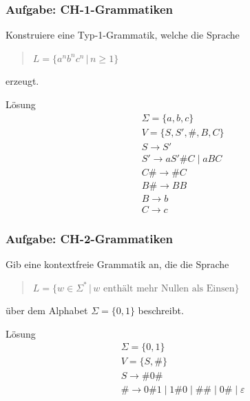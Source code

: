 \begin{frame}
\frametitle{Aufgabe: CH-1-Grammatiken}
Konstruiere eine Typ-1-Grammatik, welche die Sprache

\begin{quote}
  $L = \{a^n b^n c^n \, | \, n \geq 1\}$
\end{quote}

erzeugt.

\invincible
\pause
\begin{block}{Lösung}
\ducttape{-1cm}
\begin{align*}
&\Sigma = \{a, b, c\} \\
&V = \{ S, S', \#, B, C \} \\
&S \rightarrow S' \\
&S' \rightarrow aS'\#C \mid aBC \\
&C\# \rightarrow \#C \\
&B\# \rightarrow BB \\
&B \rightarrow b \\
&C \rightarrow c
\end{align*}
\end{block}
\vincible
\end{frame}

\begin{frame}
\frametitle{Aufgabe: CH-2-Grammatiken}
Gib eine kontextfreie Grammatik an, die die Sprache
\begin{quote}
  $L = \{w \in \Sigma^* \, | \, w \text{ enth\"alt mehr Nullen als Einsen}\}$  
\end{quote}
\"uber dem Alphabet $\Sigma = \{0, 1\}$ beschreibt.

\invincible
\pause
\begin{block}{Lösung}
\begin{align*}
&\Sigma = \{ 0, 1 \} \\
&V = \{ S, \# \} \\
&S \rightarrow \#0\# \\
&\# \rightarrow 0\#1 \mid 1\#0 \mid \#\# \mid 0\# \mid \varepsilon
\end{align*}
\end{block}
\vincible
\end{frame}



